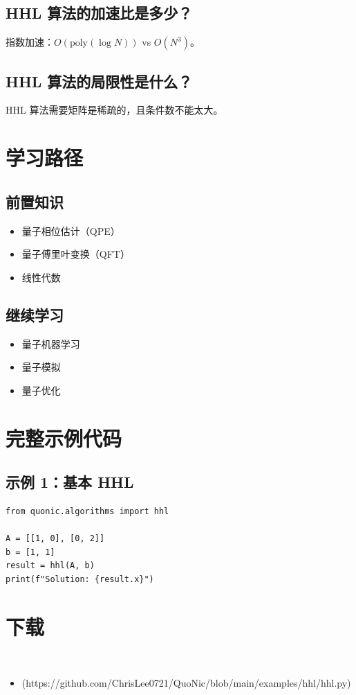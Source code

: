 \documentclass[12pt,a4paper]{article}
\begin{document}
\subsection{HHL 算法的加速比是多少？}

指数加速：$O(\text{poly}(\log N))$ vs $O(N^3)$。

\subsection{HHL 算法的局限性是什么？}

HHL 算法需要矩阵是稀疏的，且条件数不能太大。

\section{学习路径}

\subsection{前置知识}
\begin{itemize}
  \item 量子相位估计（QPE）
  \item 量子傅里叶变换（QFT）
  \item 线性代数
\end{itemize}

\subsection{继续学习}
\begin{itemize}
  \item 量子机器学习
  \item 量子模拟
  \item 量子优化
\end{itemize}

\section{完整示例代码}

\subsection{示例 1：基本 HHL}

\begin{lstlisting}[style=python]
from quonic.algorithms import hhl

A = [[1, 0], [0, 2]]
b = [1, 1]
result = hhl(A, b)
print(f"Solution: {result.x}")
\end{lstlisting}


\section{下载}

\begin{itemize}
  \item [hhl.py](https://github.com/ChrisLee0721/QuoNic/blob/main/examples/hhl/hhl.py)
\end{itemize}
\end{document}
